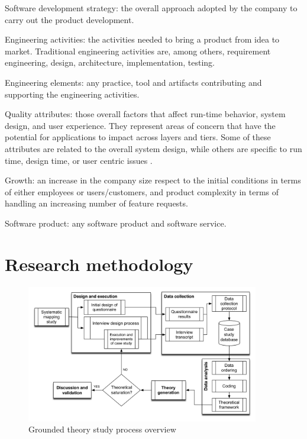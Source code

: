 \documentclass[10pt,journal,letterpaper,compsoc]{IEEEtran}
\begin{document}
\begin{compactitem}
\item Software development strategy: the overall approach adopted by the 
company to carry out the product development.
\item Engineering activities: the activities needed to bring a product from 
idea to market. Traditional engineering activities are, among others, 
requirement engineering, design, architecture, implementation, testing.
\item Engineering elements: any practice, tool and artifacts contributing and 
supporting the engineering activities.
\item Quality attributes: those overall factors that affect run-time behavior, 
system design, and user experience. They represent areas of concern that have 
the potential for applications to impact across layers and tiers. Some of these 
attributes are related to the overall system design, while others are specific 
to run time, design time, or user centric issues \cite{Microsoft2009}.
\item Growth: an increase in the company size respect to the initial conditions 
in terms of either employees or users/customers, and product complexity in terms 
of handling an increasing number of feature requests.
\item Software product: any software product and software service.
\end{compactitem}
\section{Research methodology}
\label{resmet}

\begin{figure}[!t]
\centering
\includegraphics[width=4in]{figures/completemethodology2}
\caption{Grounded theory study process overview}
\label{fig:gt:completemethodology}
\end{figure}
\end{document}

